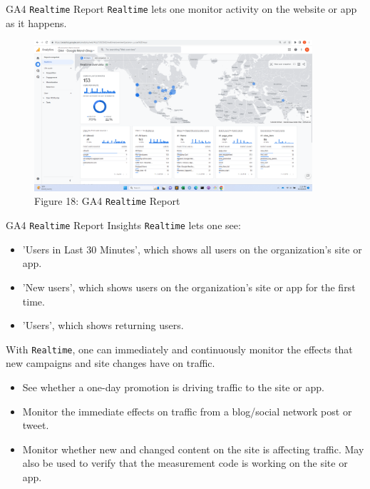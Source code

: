 \documentclass[pdf]{beamer}
\theoremstyle{remark}
\theoremstyle{definition}
\begin{document}
\begin{frame}[t]{GA4 \texttt{Realtime} Report}
\texttt{Realtime} lets one monitor activity on the website or app as it happens. %
\begin{figure}[htbp]
  \captionsetup{justification=centering}
  \includegraphics[height=5.6cm, trim=1.5cm 0.0cm 2.0cm 0.0cm width=5.6cm]{Images/GA4_3_091923_Realtime_Reports.png}
  \caption{Figure {\color{franklinblue} 18}: GA4 \texttt{Realtime} Report}
\end{figure}
\end{frame}

\begin{frame}[t]{GA4 \texttt{Realtime} Report Insights}
\small
\texttt{Realtime} lets one see: \\
\begin{itemize}
\item 'Users in Last 30 Minutes', which shows all users on the organization's site or app.
\item 'New users', which shows users on the organization's site or app for the first time.
\item 'Users', which shows returning users.
\end{itemize}
With \texttt{Realtime}, one can immediately and continuously monitor the effects that new campaigns and site changes have on traffic. \\
\begin{itemize}
\item See whether a one-day promotion is driving traffic to the site or app.
\item Monitor the immediate effects on traffic from a blog/social network post or tweet.
\item Monitor whether new and changed content on the site is affecting traffic.  May also be used to verify that the measurement code is working on the site or app.
\end{itemize}
\end{frame}
\end{document}
